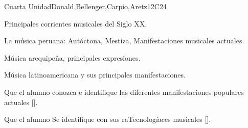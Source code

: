\begin{syllabus}
\begin{unit}{}{Cuarta Unidad}{Donald,Bellenger,Carpio,Aretz}{12}{C24}
\begin{topics}
	\item Principales corrientes musicales del Siglo XX.
	\item La música peruana: Autóctona, Mestiza, Manifestaciones musicales actuales.
	\item Música arequipeña, principales expresiones.
	\item Música latinoamericana y sus principales manifestaciones.
\end{topics}
\begin{learningoutcomes}
	\item Que el alumno conozca e identifique las diferentes manifestaciones populares actuales [\Usage].
	\item Que el alumno Se identifique con sus raTecnologíaces musicales [\Usage].
\end{learningoutcomes}
\end{unit}



\begin{coursebibliography}
\end{coursebibliography}

\end{syllabus}
